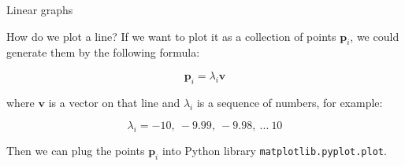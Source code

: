 \documentclass{beamer}
\begin{document}
\begin{frame}{Linear graphs}
	\begin{flushleft}
		
		How do we plot a line? If we want to plot it as a collection of points $\mathbf p_i$, we could generate them by the following formula:
		
		\begin{equation}
			\mathbf p_i = \lambda_i \mathbf v
		\end{equation}
		
		where $\mathbf v$ is a vector on that line and $\lambda_i$ is a sequence of numbers, for example:
			
		\begin{equation}
			\lambda_i = -10, \ -9.99, \ -9.98, \ ... \ 10
		\end{equation}
		
		Then we can plug the points $\mathbf p_i$ into Python library \texttt{matplotlib.pyplot.plot}.
		
	\end{flushleft}
\end{frame}
\end{document}
